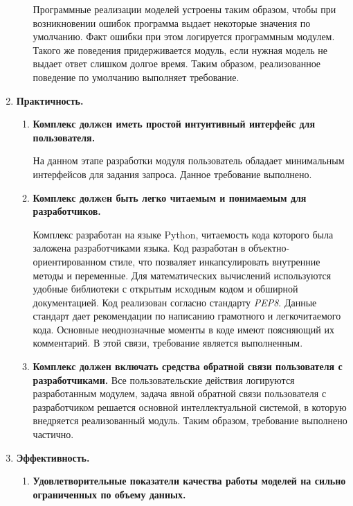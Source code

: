 \begin{enumerate}
\begin{enumerate}[label*=\arabic*.]
            Программные реализации моделей устроены таким образом, чтобы при возникновении ошибок программа выдает некоторые значения по умолчанию. Факт ошибки при этом логируется программным модулем. Такого же поведения придерживается модуль, если нужная модель не выдает ответ слишком долгое время. Таким образом, реализованное поведение по умолчанию выполняет требование.
    \end{enumerate}

    \item \textbf{Практичность.}
    \begin{enumerate}[label*=\arabic*.]
        \item \textbf{Комплекс должeн иметь простой интуитивный интерфейс для пользователя.}

            На данном этапе разработки модуля пользователь обладает минимальным интерфейсов для задания запроса. Данное требование выполнено.

        \item \textbf{Комплекс должeн быть легко читаемым и понимаемым для разработчиков.}

            Комплекс разработан на языке Python, читаемость кода которого была заложена разработчиками языка. Код разработан в объектно-ориентированном стиле, что позваляет инкапсулировать внутренние методы и переменные. Для математических вычислений используются удобные библиотеки с открытым исходным кодом и обширной документацией. Код реализован согласно стандарту \emph{PEP8}. Данные стандарт дает рекомендации по написанию грамотного и легкочитаемого кода. Основные неоднозначные моменты в коде имеют поясняющий их комментарий. В этой связи, требование является выполненным.

        \item \textbf{Комплекс должен включать средства обратной связи пользователя с разработчиками.}
            Все пользовательские действия логируются разработанным модулем, задача явной обратной связи пользователя с разработчиком решается основной интеллектуальной системой, в которую внедряется реализованный модуль. Таким образом, требование выполнено частично.

    \end{enumerate}
    \item\textbf{Эффективность.}
    \begin{enumerate}[label*=\arabic*.]
        \item \textbf{Удовлетворительные показатели качества работы моделей на сильно ограниченных по объему данных.}


\end{enumerate}
\end{enumerate}
